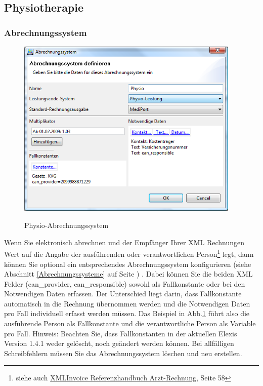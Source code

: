 \documentclass[a4paper]{scrartcl}
\begin{document}
\subsection{Physiotherapie}
\label{physiotarif}
\subsubsection{Abrechnungssystem}
\begin{figure}
  \includegraphics[width=0.95\textwidth]{abr25}\\
  \caption{Physio-Abrechnungssystem}\label{fig:abr25}
\end{figure}
Wenn Sie elektronisch abrechnen und der Empfänger Ihrer XML Rechnungen Wert auf die Angabe der ausführenden oder verantwortlichen Person\footnote{siehe auch \href{http://www.forum-datenaustausch.ch/mdinvoicerequest_xml4.00_v1.2_d.pdf}{XMLInvoice Referenzhandbuch Arzt-Rechnung}, Seite 58} legt, dann können Sie optional ein entsprechendes Abrechnungssystem konfigurieren (siehe Abschnitt \ref{Abrechnungssysteme} auf Seite \pageref{Abrechnungssysteme})
. Dabei können Sie die beiden XML Felder (ean\_provider, ean\_responsible) sowohl als Fallkonstante oder bei den Notwendigen Daten erfassen. Der Unterschied liegt darin, dass Fallkonstante automatisch in die Rechnung übernommen werden und die Notwendigen Daten pro Fall individuell erfasst werden müssen. Das Beispiel in Abb.\ref{fig:abr25} führt also die ausführende Person als Fallkonstante und die verantwortliche Person als Variable pro Fall.\linebreak
Hinweis: Beachten Sie, dass Fallkonstanten in der aktuellen Elexis Version 1.4.1 weder gelöscht, noch geändert werden können. Bei allfälligen Schreibfehlern müssen Sie das Abrechnungssystem löschen und neu erstellen.
\end{document}
